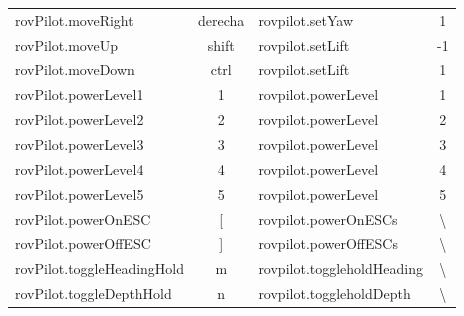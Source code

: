\begin{table}[H]
\begin{tabular}{@{}lclc@{}}
rovPilot.moveRight                & derecha                                        & rovpilot.setYaw              & 1                                  \\
rovPilot.moveUp                   & shift                                          & rovpilot.setLift             & -1                                 \\
rovPilot.moveDown                 & ctrl                                           & rovpilot.setLift             & 1                                  \\
rovPilot.powerLevel1              & 1                                              & rovpilot.powerLevel          & 1                                  \\
rovPilot.powerLevel2              & 2                                              & rovpilot.powerLevel          & 2                                  \\
rovPilot.powerLevel3              & 3                                              & rovpilot.powerLevel          & 3                                  \\
rovPilot.powerLevel4              & 4                                              & rovpilot.powerLevel          & 4                                  \\
rovPilot.powerLevel5              & 5                                              & rovpilot.powerLevel          & 5                                  \\
rovPilot.powerOnESC               & {[}                                            & rovpilot.powerOnESCs         & \textbackslash{}                   \\
rovPilot.powerOffESC              & {]}                                            & rovpilot.powerOffESCs        & \textbackslash{}                   \\
rovPilot.toggleHeadingHold        & m                                              & rovpilot.toggleholdHeading   & \textbackslash{}                   \\
rovPilot.toggleDepthHold          & n                                              & rovpilot.toggleholdDepth     & \textbackslash{}                  \\ \bottomrule
\end{tabular}
\end{table}

